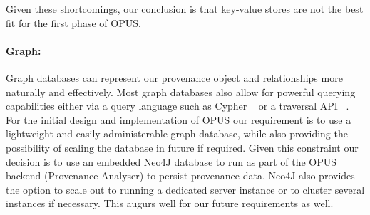\documentclass[withindex,glossary]{cam-thesis}
\begin{document}
Given these shortcomings, our conclusion is that key-value stores are not the best fit for the first phase of OPUS.

\paragraph{Graph:} 
Graph databases can represent our provenance object and relationships more naturally and effectively.
Most graph databases also allow for powerful querying capabilities either via a query language such as Cypher ~\cite{Cypher}  or a traversal API ~\cite{Gremlin}.
For the initial design and implementation of OPUS our requirement is to use a lightweight and easily administerable graph database, while also providing the possibility of scaling the database in future if required.
Given this constraint our decision is to use an embedded Neo4J database to run as part of the OPUS backend (Provenance Analyser) to persist provenance data.
Neo4J also provides the option to scale out to running a dedicated server instance or to cluster several instances if necessary.
This augurs well for our future requirements as well.


%
%
%
%
%
\end{document}
